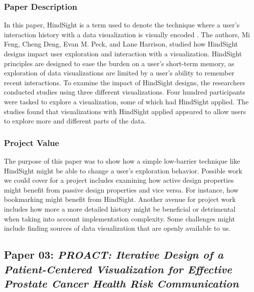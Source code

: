 \documentclass[journal]{vgtc}                %
\begin{document}
        \subsubsection{Paper Description}
        In this paper, HindSight is a term used to denote the technique where a user's interaction history with a data visualization is visually encoded \cite[p.~1]{HindSight:2016}.
        The authors, Mi Feng, Cheng Deng, Evan M. Peck, and Lane Harrison, studied how HindSight designs impact user exploration and interaction with a visualization.
        HindSight principles are designed to ease the burden on a user's short-term memory, as exploration of data visualizations are limited by a user's ability to remember recent interactions.
        To examine the impact of HindSight designs, the researchers conducted studies using three different visualizations.
        Four hundred participants were tasked to explore a visualization, some of which had HindSight applied.
        The studies found that visualizations with HindSight applied appeared to allow users to explore more and different parts of the data.

        \subsubsection{Project Value}
        The purpose of this paper was to show how a simple low-barrier technique like HindSight might be able to change a user's exploration behavior.
        Possible work we could cover for a project includes examining how active design properties might benefit from passive design properties and vice versa.
        For instance, how bookmarking might benefit from HindSight.
        Another avenue for project work includes how more a more detailed history might be beneficial or detrimental when taking into account implementation complexity.
        Some challenges might include finding sources of data visualization that are openly available to us.


    \subsection{Paper 03: \textit{PROACT: Iterative Design of a Patient-Centered Visualization for Effective Prostate Cancer Health Risk Communication} \cite{PROACT:2016}}
\end{document}
